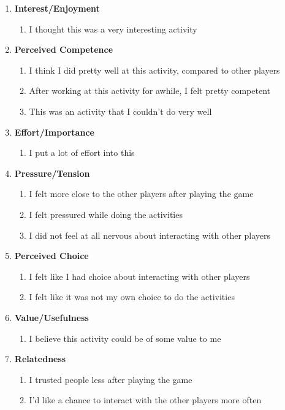\renewcommand{\labelenumiii}{\Roman{enumii}}
\begin{enumerate}
	\item \textbf{Interest/Enjoyment}
	\begin{enumerate}
	\item I thought this was a very interesting activity
	\end{enumerate}
   \item \textbf{Perceived Competence}
   \begin{enumerate}
     \item I think I did pretty well at this activity, compared to other players
     \item After working at this activity for awhile, I felt pretty competent
     \item This was an activity that I couldn't do very well
   \end{enumerate}
   \item \textbf{Effort/Importance}
   \begin{enumerate}
     \item I put a lot of effort into this
   \end{enumerate}

\item \textbf{Pressure/Tension}
   \begin{enumerate}
   	\item I felt more close to the other players after playing the game
    \item I felt pressured while doing the activities
    \item I did not feel at all nervous about interacting with other players
   \end{enumerate}   
   
   \item \textbf{Perceived Choice}
   \begin{enumerate}
     \item I felt like I had choice about interacting with other players
     \item I felt like it was not my own choice to do the activities
   \end{enumerate}
  
   
   \item \textbf{Value/Usefulness}
   \begin{enumerate}
   \item I believe this activity could be of some value to me
   \end{enumerate}
   \item \textbf{Relatedness}
   \begin{enumerate}
     \item I trusted people less after playing the game
     \item I'd like a chance to interact with the other players more often
   \end{enumerate}
\end{enumerate}

